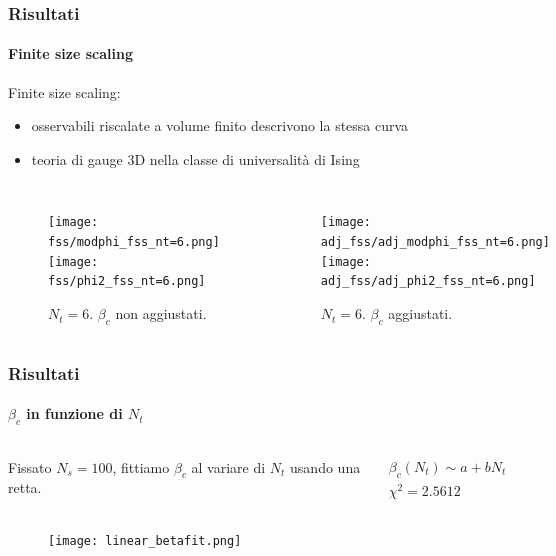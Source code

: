 \documentclass{beamer}
\begin{document}
\begin{frame}
	\frametitle{Risultati}
	\framesubtitle{Finite size scaling}
	
	\alert{Finite size scaling}:
	
	\begin{itemize}
		\item osservabili riscalate a volume finito descrivono la stessa curva 
		\item teoria di gauge 3D nella classe di universalità di Ising 
	\end{itemize}
	
	\begin{columns}
			\begin{figure}[h]
				\centering
				\texttt{[image: fss/modphi\_fss\_nt=6.png]}
				\texttt{[image: fss/phi2\_fss\_nt=6.png]}
				\caption{$N_t = 6$. $\beta_c$ non aggiustati.}
			\end{figure}
			\begin{figure}[h]
				\centering
				\texttt{[image: adj\_fss/adj\_modphi\_fss\_nt=6.png]}
				\texttt{[image: adj\_fss/adj\_phi2\_fss\_nt=6.png]}
				\caption{$N_t = 6$. $\beta_c$ aggiustati.}
			\end{figure}
	\end{columns}
\end{frame}

\begin{frame}
	\frametitle{Risultati}
	\framesubtitle{$\beta_c$ in funzione di $N_t$}

	\begin{columns}
		\column{0.5\textwidth}
			Fissato $N_s = 100$, fittiamo $\beta_c$ al variare di $N_t$ usando una retta. 
			
			
		\column{0.5\textwidth}
		\begin{equation*}
			\begin{gathered}
				\beta_c(N_t) \sim a + bN_t \\
				\chi^2 = 2.5612
			\end{gathered}
		\end{equation*}
	\end{columns}

	\begin{figure}[h]
		\centering
		\texttt{[image: linear\_betafit.png]}
	\end{figure}
\end{frame}
\end{document}
